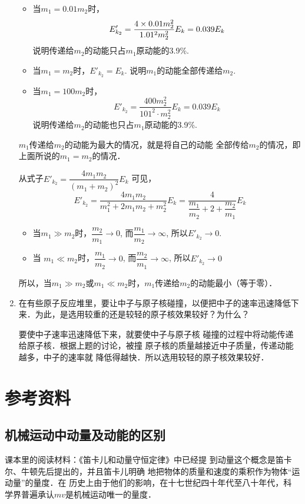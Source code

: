 \begin{enumerate}
\begin{solution}
\begin{itemize}
\item 当$m_1=0.01m_2$时，
\[E'_{k_2}=\frac{4\times 0.01m_2^2}{1.01^2m_2^2}E_k=0.039E_k\]
说明传递给$m_2$的动能只占$m_1$原动能的3.9\%.
\item 当$m_1=m_2$时，$E'_{k_2}=E_k$. 说明$m_1$的动能全部传递给$m_2$.
\item 
当$m_1=100m_2$时，
$$E'_{k_2}=\frac{400m^2_2}{101^2\cdot m^2_2}E_k=0.039E_k$$
说明传递给$m_2$的动能也只占$m_1$原动能的3.9\%.
\end{itemize}

$m_1$传递给$m_2$的动能为最大的情况，就是将自己的动能
全部传给$m_2$的情况，即上面所说的$m_1=m_2$的情况．

从式子$E'_{k_2}=\dfrac{4m_1m_2}{(m_1+m_2)^2}E_k$ 可见，
\[E'_{k_2}=\frac{4m_1m_2}{m_1^2+2m_1m_2+m_2^2}E_k=\frac{4}{\dfrac{m_1}{m_2}+2+\dfrac{m_2}{m_1}}E_k\]

\begin{itemize}
    \item 当$m_1\gg m_2$时，$\dfrac{m_2}{m_1}\to 0$, 而$\dfrac{m_1}{m_2}\to \infty$, 所以$E'_{k_2}\to 0$. 
    \item 当
$m_1\ll m_2$时，$\dfrac{m_1}{m_2}\to 0$, 而$\dfrac{m_2}{m_1}\to \infty$, 所以$E'_{k_2}\to 0$
\end{itemize}

所以，当$m_1\gg m_2$或$m_1\ll m_2$时，$m_1$传递给$m_2$的动能最小（等于零）．
\end{solution}
\item 在有些原子反应堆里，要让中子与原子核碰撞，以便把中子的速率迅速降低下来．为此，是选用较重的还是较轻的原子核效果较好？为什么？


\begin{solution}
    要使中子速率迅速降低下来，就要使中子与原子核
    碰撞的过程中将动能传递给原子核．根据上题的讨论，被撞
    原子核的质量越接近中子质量，传递动能越多，中子的速率就
    降低得越快．所以选用较轻的原子核效果较好．
\end{solution}
\end{enumerate}


\section{参考资料}
\subsection{机械运动中动量及动能的区别}

课本里的阅读材料：《笛卡儿和动量守恒定律》中已经提
到动量这个概念是笛卡尔、牛顿先后提出的，并且笛卡儿明确
地把物体的质量和速度的乘积作为物体“运动量”的量度．在
历史上由于他们的影响，在十七世纪四十年代至八十年代，科
学界普遍承认$mv$是机械运动唯一的量度．

